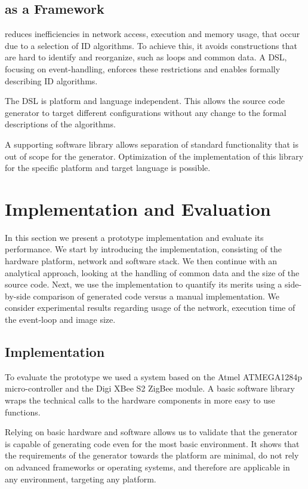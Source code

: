 \documentclass[3p,times,procedia]{elsarticle}
\begin{document}
\subsection{\NAME as a Framework}

\NAME reduces inefficiencies in network access, execution and memory usage,
that occur due to a selection of ID algorithms. To achieve this, it avoids
constructions that are hard to identify and reorganize, such as loops and
common data. A DSL, focusing on event-handling, enforces these restrictions and
enables formally describing ID algorithms.

The DSL is platform and language independent. This allows the source code
generator to target different configurations without any change to the formal
descriptions of the algorithms.

A supporting software library allows separation of standard functionality that
is out of scope for the generator. Optimization of the implementation of this
library for the specific platform and target language is possible.

\section{Implementation and Evaluation}
\label{evaluation}

In this section we present a prototype implementation and evaluate its
performance. We start by introducing the implementation, consisting of the
hardware platform, network and software stack. We then continue with an
analytical approach, looking at the handling of common data and the size of the
source code. Next, we use the implementation to quantify its merits using a
side-by-side comparison of generated code versus a manual implementation. We
consider experimental results regarding usage of the network, execution time of
the event-loop and image size.

\subsection{Implementation}

To evaluate the prototype we used a system based on the Atmel ATMEGA1284p
micro-controller and the Digi XBee S2 ZigBee module. A basic software library
wraps the technical calls to the hardware components in more easy to use
functions.

Relying on basic hardware and software allows us to validate that the generator
is capable of generating code even for the most basic environment. It shows
that the requirements of the generator towards the platform are minimal, do not
rely on advanced frameworks or operating systems, and therefore are applicable
in any environment, targeting any platform.
\end{document}
